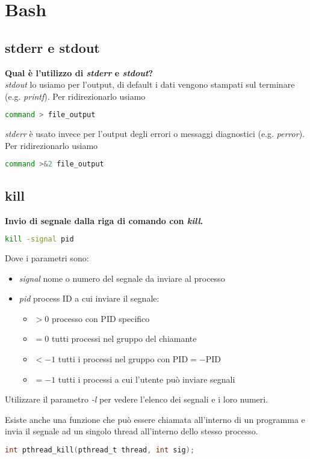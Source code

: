 \newpage
\section{Bash}
\subsection{stderr e stdout}
\textbf{Qual è l'utilizzo di \textit{stderr} e \textit{stdout}?}\\
\textit{stdout} lo usiamo per l'output, di default i dati vengono stampati sul terminare (e.g. \textit{printf}). Per ridirezionarlo usiamo
\begin{lstlisting}[language=BASH]
	command > file_output
\end{lstlisting}
\textit{stderr} è usato invece per l'output degli errori o messaggi diagnostici (e.g. \textit{perror}). Per ridirezionarlo usiamo
\begin{lstlisting}[language=BASH]
	command >&2 file_output
\end{lstlisting}

\subsection{kill}
\textbf{Invio di segnale dalla riga di comando con \textit{kill}.}\\
\begin{lstlisting}[language=BASH]
	kill -signal pid
\end{lstlisting}
Dove i parametri sono:
\begin{itemize}
	\item \textit{signal} nome o numero del segnale da inviare al processo
	\item \textit{pid} process ID a cui inviare il segnale:
	\begin{itemize}
		\item $>0$ processo con PID specifico
		\item $=0$ tutti processi nel gruppo del chiamante
		\item $<-1$ tutti i processi nel gruppo con PID$=-$PID
		\item $=-1$ tutti i processi a cui l'utente può inviare segnali
	\end{itemize}
\end{itemize}
\begin{note}
	Utilizzare il parametro \textit{-l} per vedere l'elenco dei segnali e i loro numeri.
\end{note}
Esiste anche una funzione che può essere chiamata all'interno di un programma e invia il segnale ad un singolo thread all'interno dello stesso processo.
\begin{lstlisting}[language=C]
	int pthread_kill(pthread_t thread, int sig);
\end{lstlisting}


